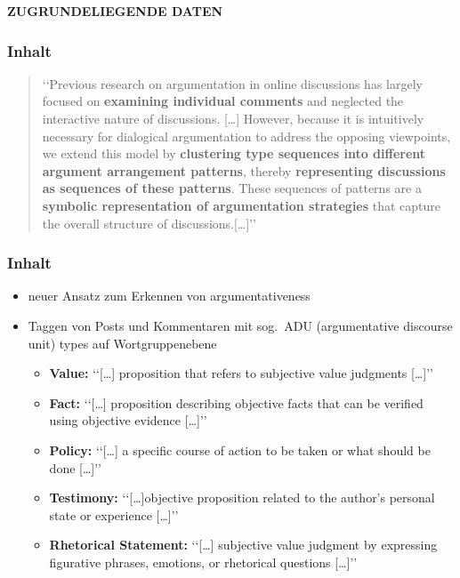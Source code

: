 \documentclass[compress,12pt]{beamer}
\begin{document}
    \begin{frame}
        \centering
        \textbf{ZUGRUNDELIEGENDE DATEN}
    \end{frame}

    \begin{frame}
        \frametitle{Inhalt}
        {\small
            \begin{quote}
                \lq\lq{}Previous research on argumentation in online discussions has largely focused on \textbf{examining individual comments} and neglected the interactive nature of discussions.
                [\ldots] However, because it is intuitively necessary for dialogical argumentation to address the opposing viewpoints, we extend this model by \textbf{clustering type sequences into different argument arrangement patterns}, thereby \textbf{representing discussions as sequences of these patterns}.
                These sequences of patterns are a \textbf{symbolic representation of argumentation strategies} that capture the overall structure of discussions.[\ldots]\rq\rq{}
            \end{quote}}
    \end{frame}

    \begin{frame}
        \frametitle{Inhalt}
        \begin{itemize}
            \item neuer Ansatz zum Erkennen von argumentativeness
            \item Taggen von Posts und Kommentaren mit sog.\ ADU (argumentative discourse unit) types auf Wortgruppenebene
            \begin{itemize}
                \item \textbf{Value:} \lq\lq{}[\ldots] proposition that refers to subjective value judgments [\ldots]\rq\rq{}
                \item \textbf{Fact:} \lq\lq{}[\ldots] proposition describing objective facts that can be verified using objective evidence [\ldots]\rq\rq{}
                \item \textbf{Policy:} \lq\lq{}[\ldots] a specific course of action to be taken or what should be done [\ldots]\rq\rq{}
                \item \textbf{Testimony:} \lq\lq{}[\ldots]objective proposition related to the author’s personal state or experience [\ldots]\rq\rq{}
                \item \textbf{Rhetorical Statement:} \lq\lq{}[\ldots] subjective value judgment by expressing figurative phrases, emotions, or rhetorical questions [\ldots]\rq\rq{}
            \end{itemize}
        \end{itemize}
    \end{frame}
    
\end{document}
